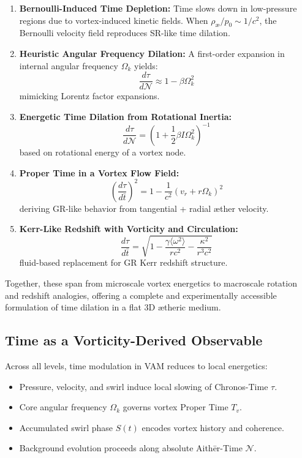 \documentclass[preprint]{revtex4-2}
\begin{document}
\begin{enumerate}
    \item \textbf{Bernoulli-Induced Time Depletion:} Time slows down in low-pressure regions due to vortex-induced kinetic fields. When \( \rho_\text{\ae} / p_0 \sim 1/c^2 \), the Bernoulli velocity field reproduces SR-like time dilation.

    \item \textbf{Heuristic Angular Frequency Dilation:} A first-order expansion in internal angular frequency \( \Omega_k \) yields:
    \[
        \frac{d\tau}{d\mathcal{N}} \approx 1 - \beta \Omega_k^2
    \]
    mimicking Lorentz factor expansions.

    \item \textbf{Energetic Time Dilation from Rotational Inertia:}
    \[
        \boxed{\frac{d\tau}{d\mathcal{N}} = \left(1 + \frac{1}{2} \beta I \Omega_k^2 \right)^{-1}}
    \]
    based on rotational energy of a vortex node.

    \item \textbf{Proper Time in a Vortex Flow Field:}
    \[
        \boxed{
        \left( \frac{d\tau}{d\bar{t}} \right)^2 = 1 - \frac{1}{c^2}(v_r + r \Omega_k)^2
        }
    \]
    deriving GR-like behavior from tangential + radial æther velocity.

    \item \textbf{Kerr-Like Redshift with Vorticity and Circulation:}
    \[
        \boxed{
        \frac{d\tau}{d\bar{t}} = \sqrt{1 - \frac{\gamma \langle \omega^2 \rangle}{r c^2} - \frac{\kappa^2}{r^3 c^2}}
        }
    \]
    fluid-based replacement for GR Kerr redshift structure.
\end{enumerate}

Together, these span from microscale vortex energetics to macroscale rotation and redshift analogies, offering a complete and experimentally accessible formulation of time dilation in a flat 3D ætheric medium.

\subsection{Time as a Vorticity-Derived Observable}

Across all levels, time modulation in VAM reduces to local energetics:
\begin{itemize}
    \item Pressure, velocity, and swirl induce local slowing of Chronos-Time \( \tau \).
    \item Core angular frequency \( \Omega_k \) governs vortex Proper Time \( T_v \).
    \item Accumulated swirl phase \( S(t) \) encodes vortex history and coherence.
    \item Background evolution proceeds along absolute Aithēr-Time \( \mathcal{N} \).
\end{itemize}
\end{document}
